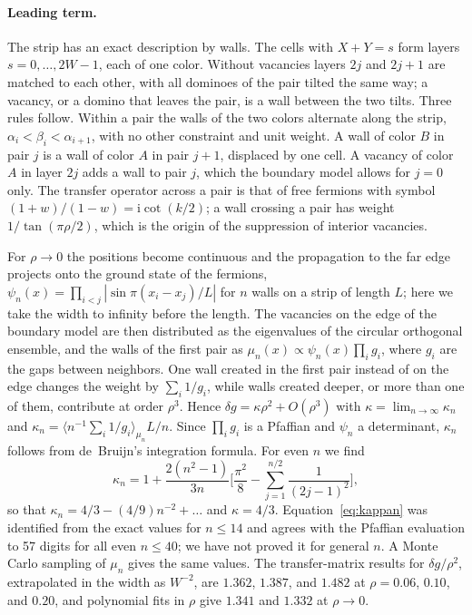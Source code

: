 \documentclass[reprint,aps,pre,superscriptaddress,longbibliography,floatfix,amsmath,amssymb]{revtex4-2}
\newcommand{\ii}{\mathrm{i}}
\begin{document}
\paragraph*{Leading term.} The strip has an exact description by walls. The cells with $X+Y=s$ form layers $s=0,\dots,2W-1$, each of one color. Without vacancies layers $2j$ and $2j+1$ are matched to each other, with all dominoes of the pair tilted the same way; a vacancy, or a domino that leaves the pair, is a wall between the two tilts. Three rules follow. Within a pair the walls of the two colors alternate along the strip, $\alpha_i<\beta_i<\alpha_{i+1}$, with no other constraint and unit weight. A wall of color $B$ in pair $j$ is a wall of color $A$ in pair $j+1$, displaced by one cell. A vacancy of color $A$ in layer $2j$ adds a wall to pair $j$, which the boundary model allows for $j=0$ only. The transfer operator across a pair is that of free fermions with symbol $(1+w)/(1-w)=\ii\cot(k/2)$; a wall crossing a pair has weight $1/\tan(\pi\rho/2)$, which is the origin of the suppression of interior vacancies.

For $\rho\to0$ the positions become continuous and the propagation to the far edge projects onto the ground state of the fermions, $\psi_n(x)=\prod_{i<j}|\sin\pi(x_i-x_j)/L|$ for $n$ walls on a strip of length $L$; here we take the width to infinity before the length. The vacancies on the edge of the boundary model are then distributed as the eigenvalues of the circular orthogonal ensemble, and the walls of the first pair as $\mu_n(x)\propto\psi_n(x)\prod_ig_i$, where $g_i$ are the gaps between neighbors. One wall created in the first pair instead of on the edge changes the weight by $\sum_i1/g_i$, while walls created deeper, or more than one of them, contribute at order $\rho^3$. Hence $\delta g=\kappa\rho^2+O(\rho^3)$ with $\kappa=\lim_{n\to\infty}\kappa_n$ and $\kappa_n=\langle n^{-1}\sum_i1/g_i\rangle_{\mu_n}L/n$. Since $\prod_ig_i$ is a Pfaffian and $\psi_n$ a determinant, $\kappa_n$ follows from de~Bruijn's integration formula. For even $n$ we find
\begin{equation}\label{eq:kappan}
  \kappa_n=1+\frac{2(n^2-1)}{3n}\biggl[\frac{\pi^2}{8}-\sum_{j=1}^{n/2}\frac{1}{(2j-1)^2}\biggr],
\end{equation}
so that $\kappa_n=4/3-(4/9)n^{-2}+\dots$ and $\kappa=4/3$. Equation~\eqref{eq:kappan} was identified from the exact values for $n\le14$ and agrees with the Pfaffian evaluation to 57 digits for all even $n\le40$; we have not proved it for general $n$. A Monte Carlo sampling of $\mu_n$ gives the same values. The transfer-matrix results for $\delta g/\rho^2$, extrapolated in the width as $W^{-2}$, are $1.362$, $1.387$, and $1.482$ at $\rho=0.06$, $0.10$, and $0.20$, and polynomial fits in $\rho$ give $1.341$ and $1.332$ at $\rho\to0$.


\end{document}

